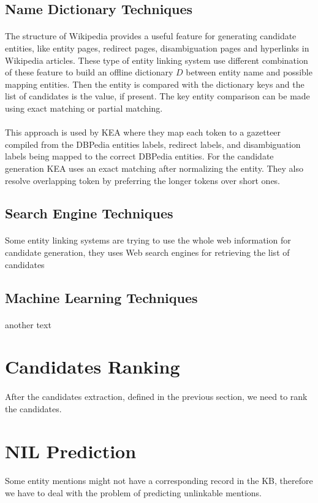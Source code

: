 \subsection{Name Dictionary Techniques}
\paragraph{}
The structure of Wikipedia provides a useful feature for generating candidate entities, like entity pages, redirect pages, disambiguation pages and hyperlinks in Wikipedia articles. These type of entity linking system use different combination of these feature to build an offline dictionary $D$ between entity name and possible mapping entities. Then the entity is compared with the dictionary keys and the list of candidates is the value, if present. The key entity comparison can be made using exact matching or partial matching. 
\paragraph{}
This approach is used by KEA\cite{waitelonisnamed} where they map each token to a gazetteer compiled from the DBPedia entities labels, redirect labels, and disambiguation labels being mapped to the correct DBPedia entities. For the candidate generation KEA uses an exact matching  after normalizing the entity. They also resolve overlapping token by preferring the longer tokens over short ones.

\subsection{Search Engine Techniques}
\paragraph{}
Some entity linking systems are trying to use the whole web information for candidate generation, they uses Web search engines for retrieving the list of candidates    

\subsection{Machine Learning Techniques}
\paragraph{}
another text

\section{Candidates Ranking}
\paragraph{}
After the candidates extraction, defined in the previous section, we need to rank the candidates.

\section{NIL Prediction}
\paragraph{}
Some entity mentions might not have a corresponding record in the KB, therefore we have to deal with the problem of predicting unlinkable mentions. 